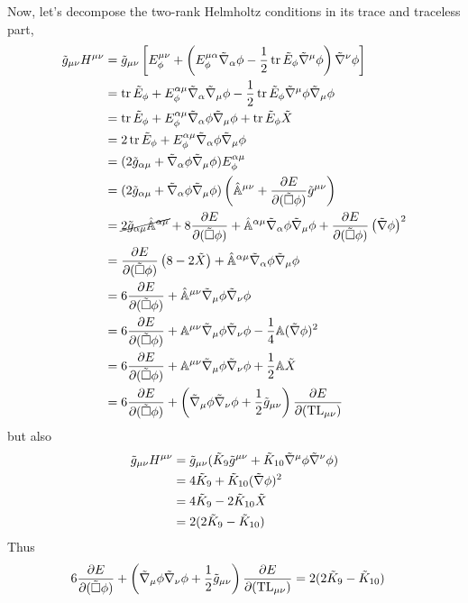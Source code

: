 Now, let's decompose the two-rank Helmholtz conditions in its trace and traceless part,
\begin{align}
  \tilde{g}_{\mu\nu }H^{\mu\nu }&=\tilde{g}_{\mu\nu }\left[E^{\mu\nu }_\phi+\left(E^{\mu\alpha }_\phi \tilde{\nabla}_\alpha \phi-\frac{1}{2}\tr\tilde{E}_\phi\tilde{\nabla}^\mu\phi \right)\tilde{\nabla}^\nu\phi \right]\\
  &=\tr \tilde{E}_\phi +E^{\alpha\mu }_\phi \tilde{\nabla}_\alpha\tilde{\nabla}_\mu\phi -\frac{1}{2}\tr \tilde{E}_\phi \tilde{\nabla}^\mu\phi \tilde{\nabla}_\mu\phi \\
  &=\tr\tilde{E}_\phi +E^{\alpha\mu }_\phi\tilde{\nabla}_\alpha\phi\tilde{\nabla}_\mu\phi +\tr \tilde{E}_\phi \tilde{X}\\
  &=2\tr\tilde{E}_\phi +E^{\alpha\mu }_\phi\tilde{\nabla}_\alpha\phi\tilde{\nabla}_\mu\phi\\
  &=(2\tilde{g}_{\alpha\mu }+\tilde{\nabla}_\alpha\phi\tilde{\nabla}_\mu\phi )E^{\alpha\mu }_\phi \\
  &=(2\tilde{g}_{\alpha\mu }+\tilde{\nabla}_\alpha\phi\tilde{\nabla}_\mu\phi )\left(\hat{\mathbb{A} }^{\mu\nu }+\pdv{E}{(\tilde{\Box}\phi)}\tilde{g}^{\mu\nu }\right)\\
  &=\cancel{2\tilde{g}_{\alpha\mu }\hat{\mathbb{A}}^{\alpha\mu }}+8\pdv{E}{(\tilde{\Box}\phi)}+\hat{\mathbb{A} }^{\alpha\mu }\tilde{\nabla}_\alpha\phi\tilde{\nabla}_\mu\phi +\pdv{E}{(\tilde{\Box}\phi)}\left(\tilde{\nabla}\phi \right)^2\\
  &=\pdv{E}{(\tilde{\Box}\phi)}\left(8-2\tilde{X}\right)+\hat{\mathbb{A}}^{\alpha\mu }\tilde{\nabla}_\alpha\phi\tilde{\nabla}_\mu\phi \\
  &=6\pdv{E}{(\tilde{\Box}\phi)}+\hat{\mathbb{A} }^{\mu\nu}\tilde{\nabla}_\mu\phi\tilde{\nabla}_\nu\phi \\
  &=6\pdv{E}{(\tilde{\Box}\phi)}+\mathbb{A}^{\mu\nu}\tilde{\nabla}_\mu\phi\tilde{\nabla}_\nu\phi-\frac{1}{4}\mathbb{A} (\tilde{\nabla}\phi )^2\\
  &=6\pdv{E}{(\tilde{\Box}\phi)}+\mathbb{A}^{\mu\nu}\tilde{\nabla}_\mu\phi\tilde{\nabla}_\nu\phi+\frac{1}{2}\mathbb{A} \tilde{X}\\
  &=6\pdv{E}{(\tilde{\Box}\phi)}+\left(\tilde{\nabla}_\mu\phi\tilde{\nabla}_\nu\phi +\frac{1}{2}\tilde{g}_{\mu\nu }\right)\pdv{E}{(\text{TL}_{\mu\nu})}
\end{align}
but also
\begin{align}
  \tilde{g}_{\mu\nu }H^{\mu\nu }&=\tilde{g}_{\mu\nu }(\tilde{K}_9\tilde{g}^{\mu\nu }+\tilde{K}_{10}\tilde{\nabla}^\mu\phi\tilde{\nabla}^\nu\phi)\\
  &=4\tilde{K}_9+\tilde{K}_{10}(\tilde{\nabla}\phi )^2\\
  &=4\tilde{K}_9-2\tilde{K}_{10}\tilde{X}\\
  &=2(2\tilde{K}_9-\tilde{K}_{10})
\end{align}
Thus
\begin{align}
  6\pdv{E}{(\tilde{\Box}\phi)}+\left(\tilde{\nabla}_\mu\phi\tilde{\nabla}_\nu\phi +\frac{1}{2}\tilde{g}_{\mu\nu }\right)\pdv{E}{(\text{TL}_{\mu\nu})}&=2(2\tilde{K}_9-\tilde{K}_{10})
\end{align}
